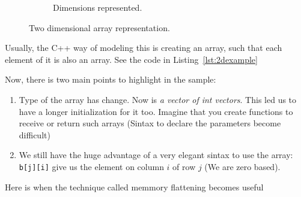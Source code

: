 \begin{figure}[htp]
\begin{subfigure}[b]{0.25\textwidth}
    \caption{Dimensions represented.}
    \label{fig:2b}
  \end{subfigure}
  \caption{Two dimensional array representation.}
  \label{fig:2D}
\end{figure}

Usually, the C++ way of modeling this is creating an array, such that each element of it is also an array. See the code in Listing~\ref{lst:2dexample}

{\centering
\begin{minipage}{\linewidth}
\end{minipage}
\par
}
\vspace{0.5cm}
Now, there is two main points to highlight in the sample:
\begin{enumerate}
 \item Type of the array has change. Now is \emph{a vector of int vectors}. This led us to have a longer initialization for it too. Imagine that you create functions to receive or return such arrays (Sintax to declare the parameters become difficult)
 \item We still have the huge advantage of a very elegant sintax to use the array: \texttt{b[j][i]} give us the element on column $i$ of row $j$ (We are zero based).
\end{enumerate}
Here is when the technique called memmory flattening becomes useful

